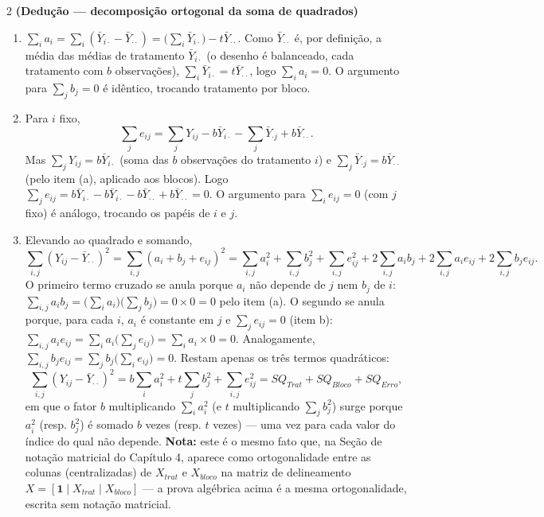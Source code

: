 \documentclass[11pt]{article}
\begin{document}
\begin{questao}{2} \textbf{(Dedução --- decomposição ortogonal da soma de quadrados)}
\end{questao}
\begin{solucao}
\begin{enumerate}[label=(\alph*)]
  \item $\displaystyle\sum_i a_i = \sum_i(\bar Y_{i\cdot}-\bar Y_{\cdot\cdot}) =
    \Big(\sum_i \bar Y_{i\cdot}\Big) - t\bar Y_{\cdot\cdot}$. Como $\bar Y_{\cdot\cdot}$ é, por
    definição, a média das médias de tratamento $\bar Y_{i\cdot}$ (o desenho é balanceado, cada
    tratamento com $b$ observações), $\sum_i \bar Y_{i\cdot} = t\bar Y_{\cdot\cdot}$, logo
    $\sum_i a_i = 0$. O argumento para $\sum_j b_j=0$ é idêntico, trocando tratamento por bloco.
  \item Para $i$ fixo,
    $$
    \sum_j e_{ij} = \sum_j Y_{ij} - b\bar Y_{i\cdot} - \sum_j \bar Y_{\cdot j} + b\bar Y_{\cdot\cdot}.
    $$
    Mas $\sum_j Y_{ij} = b\bar Y_{i\cdot}$ (soma das $b$ observações do tratamento $i$) e
    $\sum_j \bar Y_{\cdot j} = b\bar Y_{\cdot\cdot}$ (pelo item (a), aplicado aos blocos). Logo
    $\sum_j e_{ij} = b\bar Y_{i\cdot} - b\bar Y_{i\cdot} - b\bar Y_{\cdot\cdot} + b\bar
    Y_{\cdot\cdot} = 0$. O argumento para $\sum_i e_{ij}=0$ (com $j$ fixo) é análogo, trocando os
    papéis de $i$ e $j$.
  \item Elevando ao quadrado e somando,
    $$
    \sum_{i,j}(Y_{ij}-\bar Y_{\cdot\cdot})^2 = \sum_{i,j}(a_i+b_j+e_{ij})^2 =
    \sum_{i,j}a_i^2 + \sum_{i,j}b_j^2 + \sum_{i,j}e_{ij}^2
    + 2\sum_{i,j}a_ib_j + 2\sum_{i,j}a_ie_{ij} + 2\sum_{i,j}b_je_{ij}.
    $$
    O primeiro termo cruzado se anula porque $a_i$ não depende de $j$ nem $b_j$ de $i$:
    $\sum_{i,j}a_ib_j = \big(\sum_i a_i\big)\big(\sum_j b_j\big) = 0\times 0 = 0$ pelo item (a).
    O segundo se anula porque, para cada $i$, $a_i$ é constante em $j$ e $\sum_j e_{ij}=0$ (item
    b): $\sum_{i,j}a_ie_{ij} = \sum_i a_i\big(\sum_j e_{ij}\big) = \sum_i a_i\times 0 = 0$.
    Analogamente, $\sum_{i,j}b_je_{ij}=\sum_j b_j\big(\sum_i e_{ij}\big)=0$. Restam apenas os
    três termos quadráticos:
    $$
    \sum_{i,j}(Y_{ij}-\bar Y_{\cdot\cdot})^2 = b\sum_i a_i^2 + t\sum_j b_j^2 + \sum_{i,j}e_{ij}^2
    = SQ_{Trat} + SQ_{Bloco} + SQ_{Erro},
    $$
    em que o fator $b$ multiplicando $\sum_i a_i^2$ (e $t$ multiplicando $\sum_j b_j^2$) surge
    porque $a_i^2$ (resp. $b_j^2$) é somado $b$ vezes (resp. $t$ vezes) — uma vez para cada valor
    do índice do qual não depende. \textbf{Nota:} este é o mesmo fato que, na Seção de notação
    matricial do Capítulo 4, aparece como ortogonalidade entre as colunas (centralizadas) de
    $X_{trat}$ e $X_{bloco}$ na matriz de delineamento $X=[\mathbf1\mid X_{trat}\mid X_{bloco}]$
    — a prova algébrica acima é a mesma ortogonalidade, escrita sem notação matricial.
\end{enumerate}
\end{solucao}
\end{document}
